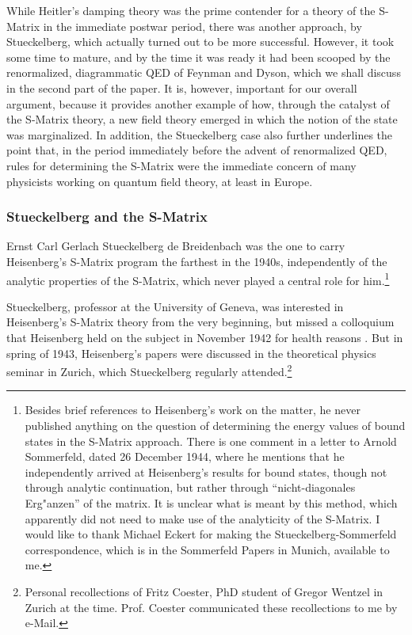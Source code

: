 \documentclass[12pt,a4paper]{article}
\begin{document}
While Heitler's damping theory was the prime contender for a theory of the S-Matrix in the immediate postwar period, there was another approach, by Stueckelberg, which actually turned out to be more successful. However, it took some time to mature, and by the time it was ready it had been scooped by the renormalized, diagrammatic QED of Feynman and Dyson, which we shall discuss in the second part of the paper. It is, however, important for our overall argument, because it provides another example of how, through the catalyst of the S-Matrix theory, a new field theory emerged in which the notion of the state was marginalized. In addition, the Stueckelberg case also further underlines the point that, in the period immediately before the advent of renormalized QED, rules for determining the S-Matrix were the immediate concern of many physicists working on quantum field theory, at least in Europe.

\subsubsection{Stueckelberg and the S-Matrix}

Ernst Carl Gerlach Stueckelberg de Breidenbach was the one to carry Heisenberg's S-Matrix program the farthest in the 1940s, independently of the analytic properties of the S-Matrix, which never played a central role for him.\footnote{Besides brief references to Heisenberg's work on the matter, he never published anything on the question of determining the energy values of bound states in the S-Matrix approach. There is one comment in a letter to Arnold Sommerfeld, dated 26 December 1944, where he mentions that he independently arrived at Heisenberg's results for bound states, though not through analytic continuation, but rather through ``nicht-diagonales Erg"anzen'' of the matrix. It is unclear what is meant by this method, which apparently did not need to make use of the analyticity of the S-Matrix. I would like to thank Michael Eckert for making the Stueckelberg-Sommerfeld correspondence, which is in the Sommerfeld Papers in Munich, available to me.} 

Stueckelberg, professor at the University of Geneva, was interested in Heisenberg's S-Matrix theory from the very beginning, but missed a colloquium that Heisenberg held on the subject in November 1942 for health reasons \citep[p. 555-556]{rechenberg_1989_the-early}. But in spring of 1943, Heisenberg's papers were discussed in the theoretical physics seminar in Zurich, which Stueckelberg regularly attended.\footnote{Personal recollections of Fritz Coester, PhD student of Gregor Wentzel in Zurich at the time. Prof. Coester communicated these recollections to me by e-Mail.}
\end{document}
